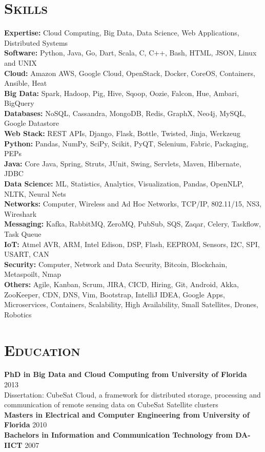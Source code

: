 \begin{resume}
\section{\textsc{Skills}}
{\bf Expertise:} Cloud Computing, Big Data, Data Science, Web Applications, Distributed Systems
\\ {\bf Software:} Python, Java, Go, Dart, Scala, C, C++, Bash, HTML, JSON, Linux and UNIX
\\ {\bf Cloud:} Amazon AWS, Google Cloud, OpenStack, Docker, CoreOS, Containers, Ansible, Heat
\\ {\bf Big Data:} Spark, Hadoop, Pig, Hive, Sqoop, Oozie, Falcon, Hue, Ambari, BigQuery
\\ {\bf Databases:} NoSQL, Cassandra, MongoDB, Redis, GraphX, Neo4j, MySQL, Google Datastore
\\ {\bf Web Stack:} REST APIs, Django, Flask, Bottle, Twisted, Jinja, Werkzeug
\\ {\bf Python:} Pandas, NumPy, SciPy, Scikit, PyQT, Selenium, Fabric, Packaging, PEPs
\\ {\bf Java:} Core Java, Spring, Struts, JUnit, Swing, Servlets, Maven, Hibernate, JDBC
\\ {\bf Data Science:} ML, Statistics, Analytics, Visualization, Pandas, OpenNLP, NLTK, Neural Nets
\\ {\bf Networks:} Computer, Wireless and Ad Hoc Networks, TCP/IP, 802.11/15, NS3, Wireshark
\\ {\bf Messaging:} Kafka, RabbitMQ, ZeroMQ, PubSub, SQS, Zaqar, Celery, Taskflow, Task Queue
\\ {\bf IoT:} Atmel AVR, ARM, Intel Edison, DSP, Flash, EEPROM, Sensors, I2C, SPI, USART, CAN
\\ {\bf Security:} Computer, Network and Data Security, Bitcoin, Blockchain, Metaspoilt, Nmap
\\ {\bf Others:} Agile, Kanban, Scrum, JIRA, CICD, Hiring, Git, Android, Akka, ZooKeeper, CDN, DNS, Vim, Bootstrap, IntelliJ IDEA, Google Apps, Microservices, Containers, Scalability, High Availability, Small Satellites, Drones, Robotics

\section{\textsc{Education}}
\textbf{PhD in Big Data and Cloud Computing from University of Florida} \hfill 2013 \\
Dissertation: CubeSat Cloud, a framework for distributed storage, processing and communication of remote sensing data on CubeSat Satellite clusters\\
\textbf{Masters in Electrical and Computer Engineering from University of Florida} \hfill 2010 \\
\textbf{Bachelors in Information and Communication Technology from DA-IICT} \hfill 2007


\end{resume}

